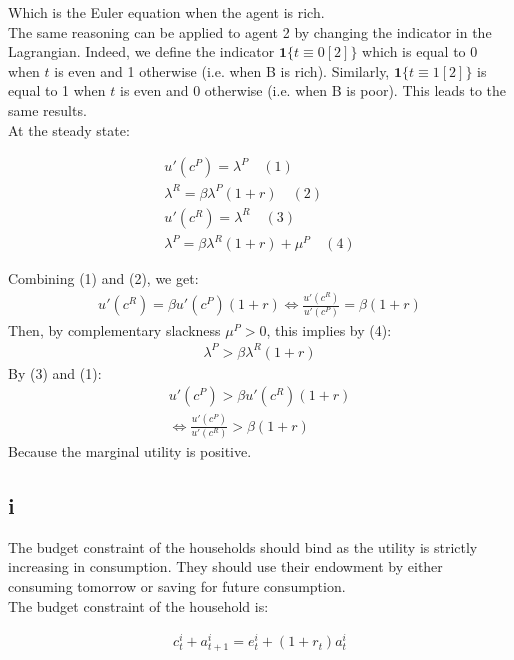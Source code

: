 \documentclass{article}
\begin{document}
Which is the Euler equation when the agent is rich.\\

The same reasoning can be applied to agent 2 by changing the indicator in the Lagrangian. Indeed, we define the indicator $\mathbf{1}\{t\equiv0[2]\}$ which is equal to 0 when $t$ is even and 1 otherwise (i.e. when B is rich). Similarly, $\mathbf{1}\{t\equiv1[2]\}$ is equal to 1 when $t$ is even and 0 otherwise (i.e. when B is poor). This leads to the same results.\\

At the steady state:

\begin{gather*}
    u'(c^P)=\lambda^P\quad(1)\\
    \lambda^R=\beta\lambda^P(1+r)\quad(2)\\
    u'(c^R)=\lambda^R\quad(3)\\
    \lambda^P=\beta\lambda^R(1+r)+\mu^P \quad(4)
\end{gather*}

Combining (1) and (2), we get:
\begin{gather*}
    u'(c^R)=\beta u'(c^P)(1+r)\Leftrightarrow\frac{u'(c^R)}{u'(c^P)}=\beta (1+r)
\end{gather*}
Then, by complementary slackness $\mu^P>0$, this implies by (4):
\begin{gather*}
   \lambda^P>\beta\lambda^R(1+r)
\end{gather*}
By (3) and (1):
\begin{gather*}
    u'(c^P)>\beta u'(c^R)(1+r)\\
    \Leftrightarrow \frac{ u'(c^P)}{u'(c^R)} >\beta (1+r)
\end{gather*}
Because the marginal utility is positive.



\subsection{i}

The budget constraint of the households should bind as the utility is strictly increasing in consumption. They should use their endowment by either consuming tomorrow or saving for future consumption.\\

The budget constraint of the household is:

\begin{gather*}
    c_t^i+a^i_{t+1}= e_t^i+(1+r_t)a_t^i
\end{gather*}
\end{document}
